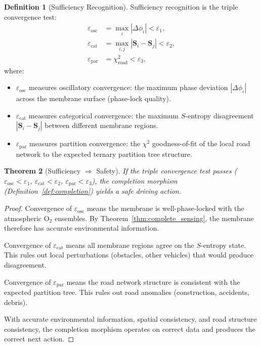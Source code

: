 \documentclass[twocolumn,10pt]{article}
\newtheorem{theorem}{Theorem}[section]
\theoremstyle{definition}
\newtheorem{definition}[theorem]{Definition}
\theoremstyle{remark}
\begin{document}
\begin{definition}[Sufficiency Recognition]
\label{def:sufficiency}
Sufficiency recognition is the triple convergence test:
\begin{align}
  \varepsilon_{\mathrm{osc}} &= \max_i |\Delta\phi_i| < \varepsilon_1, \label{eq:eps_osc} \\
  \varepsilon_{\mathrm{cat}} &= \max_{i,j} |\mathbf{S}_i - \mathbf{S}_j| < \varepsilon_2, \label{eq:eps_cat} \\
  \varepsilon_{\mathrm{par}} &= \chi^2_{\mathrm{road}} < \varepsilon_3, \label{eq:eps_par}
\end{align}
where:
\begin{itemize}
  \item $\varepsilon_{\mathrm{osc}}$ measures oscillatory convergence: the maximum phase deviation $|\Delta\phi_i|$ across the membrane surface (phase-lock quality).
  \item $\varepsilon_{\mathrm{cat}}$ measures categorical convergence: the maximum $S$-entropy disagreement $|\mathbf{S}_i - \mathbf{S}_j|$ between different membrane regions.
  \item $\varepsilon_{\mathrm{par}}$ measures partition convergence: the $\chi^2$ goodness-of-fit of the local road network to the expected ternary partition tree structure.
\end{itemize}
\end{definition}

\begin{theorem}[Sufficiency $\Rightarrow$ Safety]
\label{thm:sufficiency_safety}
If the triple convergence test passes ($\varepsilon_{\mathrm{osc}} < \varepsilon_1$, $\varepsilon_{\mathrm{cat}} < \varepsilon_2$, $\varepsilon_{\mathrm{par}} < \varepsilon_3$), the completion morphism (Definition~\ref{def:completion}) yields a safe driving action.
\end{theorem}

\begin{proof}
Convergence of $\varepsilon_{\mathrm{osc}}$ means the membrane is well-phase-locked with the atmospheric $\mathrm{O}_2$ ensembles. By Theorem~\ref{thm:complete_sensing}, the membrane therefore has accurate environmental information.

Convergence of $\varepsilon_{\mathrm{cat}}$ means all membrane regions agree on the $S$-entropy state. This rules out local perturbations (obstacles, other vehicles) that would produce disagreement.

Convergence of $\varepsilon_{\mathrm{par}}$ means the road network structure is consistent with the expected partition tree. This rules out road anomalies (construction, accidents, debris).

With accurate environmental information, spatial consistency, and road structure consistency, the completion morphism operates on correct data and produces the correct next action.
\end{proof}
\end{document}
